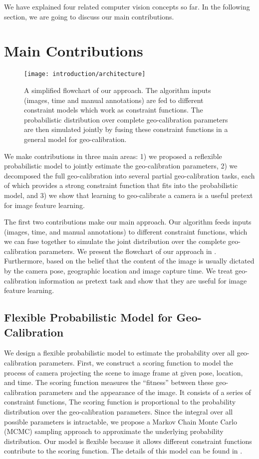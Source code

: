 We have explained four related computer vision concepts so far. In the
following section, we are going to discuss our main contributions.

\section{Main Contributions}

\begin{figure}
  \centering
  \texttt{[image: introduction/architecture]}
  \caption{A simplified flowchart of our approach. The algorithm
inputs (images, time and manual annotations) are fed to different
constraint models which work as constraint functions. 
The probabilistic distribution over complete geo-calibration
parameters are then simulated jointly by fusing these constraint
functions in a general model for geo-calibration.}
  \label{fig:intro:architecture}
\end{figure}

We make contributions in three main areas: 1) we
proposed a reflexible probabilistic model to jointly estimate the
geo-calibration parameters, 2) we decomposed the full geo-calibration
into several partial geo-calibration tasks, each of which provides a
strong constraint function that fits into the probabilistic model,
and 3) we show that learning to geo-calibrate a camera is a useful
pretext for image feature learning.
 
The first two contributions make our main approach. Our
algorithm feeds inputs (images, time, and manual annotations) to
different constraint functions, which we can fuse together to simulate
the joint distribution over the complete geo-calibration parameters.
We present the flowchart of our approach in
.
%
Furthermore, based on the belief that the content of the image is usually dictated
by the camera pose, geographic location and image capture time. We
treat geo-calibration information as pretext task and show that they
are useful for image feature learning.


\subsection{Flexible Probabilistic Model for Geo-Calibration}
We design a flexible probabilistic model to estimate the probability
over all geo-calibration parameters.
First, we construct a scoring function to model the process of camera
projecting the scene to image frame at given pose, location, and time.
%
The scoring function measures the ``fitness'' between these
geo-calibration parameters and the appearance of the image. 
It consists of a series of constraint functions,
%
The scoring function is proportional to the probability distribution
over the geo-calibration parameters. Since the integral over all
possible parameters is intractable, we propose a Markov Chain Monte
Carlo (MCMC) sampling approach to approximate the underlying
probability distribution. 
%
Our model is flexible because it allows different constraint functions
contribute to the scoring function. The details of this model can be
found in .

